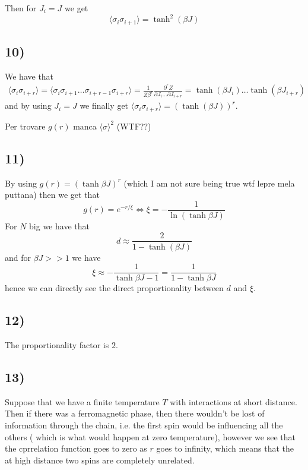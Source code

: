 \documentclass[10pt,a4paper]{book}
\newcommand{\p}{\partial}
\begin{document}
Then for $J_i=J$ we get 
$$\langle \sigma_i\sigma_{i+1}\rangle =\tanh^2(\beta J)$$


\subsection*{10)}

We have that
\begin{align*}
\langle\sigma_i\sigma_{i+r}\rangle=\langle\sigma_i\sigma_{i+1}\ldots\sigma_{i+r-1}\sigma_{i+r}\rangle=\frac{1}{Z\beta^r}\frac{\p ^r Z}{\p J_i\ldots \p J_{i+r}}=\tanh(\beta J_i)\ldots\tanh(\beta J_{i+r})
\end{align*}
and by using $J_i=J$ we finally get
$\langle \sigma_i\sigma_{i+r}\rangle =(\tanh(\beta J))^r$. 

Per trovare $g(r)$ manca $\langle \sigma\rangle^2$ (WTF??)

\subsection*{11)}
By using $g(r)=(\tanh\beta J)^r$ (which I am not sure being true wtf lepre mela puttana) then we get that 
$$g(r)=e^{-r/\xi}\Leftrightarrow \xi=-\frac{1}{\ln(\tanh\beta J)}$$
For $N$ big we have that 
$$d\approx \frac{2}{1-\tanh(\beta J)}$$
and for $\beta J>>1$ we have
$$\xi\approx -\frac{1}{\tanh\beta J-1}=\frac{1}{1-\tanh\beta J}$$
hence we can directly see the direct proportionality between $d$ and $\xi$. 

\subsection*{12)}

The proportionality factor is $2$. 

\subsection*{13)}
Suppose that we have a finite temperature $T$ with interactions at short distance. Then if there was a ferromagnetic phase, then there wouldn't be lost of information through the chain, i.e. the first spin would be influencing all the others ( which is what would happen at zero temperature), however we see that the cprrelation function goes to zero as $r$ goes to infinity, which means that the at high distance two spins are completely unrelated.
\end{document}
